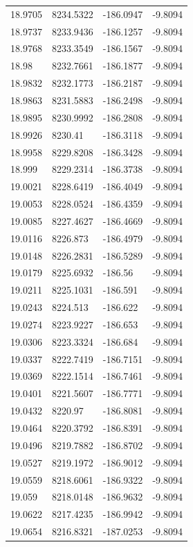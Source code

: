 \begin{table}[H]
\begin{tabular}{llll}
18.9705 & 8234.5322 & -186.0947 & -9.8094 \\
18.9737 & 8233.9436 & -186.1257 & -9.8094 \\
18.9768 & 8233.3549 & -186.1567 & -9.8094 \\
18.98 & 8232.7661 & -186.1877 & -9.8094 \\
18.9832 & 8232.1773 & -186.2187 & -9.8094 \\
18.9863 & 8231.5883 & -186.2498 & -9.8094 \\
18.9895 & 8230.9992 & -186.2808 & -9.8094 \\
18.9926 & 8230.41 & -186.3118 & -9.8094 \\
18.9958 & 8229.8208 & -186.3428 & -9.8094 \\
18.999 & 8229.2314 & -186.3738 & -9.8094 \\
19.0021 & 8228.6419 & -186.4049 & -9.8094 \\
19.0053 & 8228.0524 & -186.4359 & -9.8094 \\
19.0085 & 8227.4627 & -186.4669 & -9.8094 \\
19.0116 & 8226.873 & -186.4979 & -9.8094 \\
19.0148 & 8226.2831 & -186.5289 & -9.8094 \\
19.0179 & 8225.6932 & -186.56 & -9.8094 \\
19.0211 & 8225.1031 & -186.591 & -9.8094 \\
19.0243 & 8224.513 & -186.622 & -9.8094 \\
19.0274 & 8223.9227 & -186.653 & -9.8094 \\
19.0306 & 8223.3324 & -186.684 & -9.8094 \\
19.0337 & 8222.7419 & -186.7151 & -9.8094 \\
19.0369 & 8222.1514 & -186.7461 & -9.8094 \\
19.0401 & 8221.5607 & -186.7771 & -9.8094 \\
19.0432 & 8220.97 & -186.8081 & -9.8094 \\
19.0464 & 8220.3792 & -186.8391 & -9.8094 \\
19.0496 & 8219.7882 & -186.8702 & -9.8094 \\
19.0527 & 8219.1972 & -186.9012 & -9.8094 \\
19.0559 & 8218.6061 & -186.9322 & -9.8094 \\
19.059 & 8218.0148 & -186.9632 & -9.8094 \\
19.0622 & 8217.4235 & -186.9942 & -9.8094 \\
19.0654 & 8216.8321 & -187.0253 & -9.8094 \\

\end{tabular}
\end{table}
